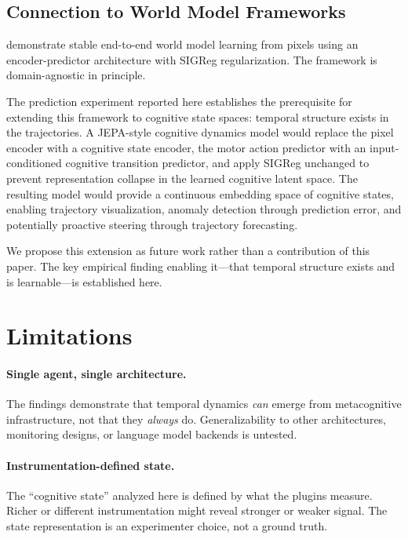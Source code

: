\documentclass[twoside,11pt]{article}
\begin{document}
\subsection{Connection to World Model Frameworks}
\label{sec:discuss-jepa}

\citet{maes2026lewm} demonstrate stable end-to-end world model learning from
pixels using an encoder-predictor architecture with SIGReg regularization. The
framework is domain-agnostic in principle.

The prediction experiment reported here establishes the prerequisite for
extending this framework to cognitive state spaces: temporal structure exists in
the trajectories. A JEPA-style cognitive dynamics model would replace the pixel
encoder with a cognitive state encoder, the motor action predictor with an
input-conditioned cognitive transition predictor, and apply SIGReg unchanged to
prevent representation collapse in the learned cognitive latent space. The
resulting model would provide a continuous embedding space of cognitive states,
enabling trajectory visualization, anomaly detection through prediction error,
and potentially proactive steering through trajectory forecasting.

We propose this extension as future work rather than a contribution of this
paper. The key empirical finding enabling it---that temporal structure exists
and is learnable---is established here.


\section{Limitations}
\label{sec:limitations}

\paragraph{Single agent, single architecture.} The findings demonstrate that
temporal dynamics \emph{can} emerge from metacognitive infrastructure, not that
they \emph{always} do. Generalizability to other architectures, monitoring
designs, or language model backends is untested.

\paragraph{Instrumentation-defined state.} The ``cognitive state'' analyzed here
is defined by what the plugins measure. Richer or different instrumentation
might reveal stronger or weaker signal. The state representation is an
experimenter choice, not a ground truth.
\end{document}
